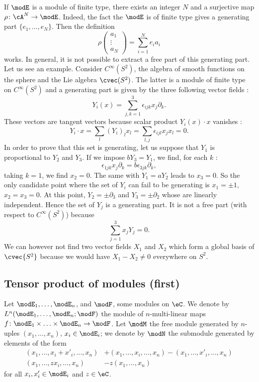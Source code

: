 If $\modE$ is a module of finite type, there exists an integer $N$ and a surjective map $\rho\colon \cA^N\to \modE$. Indeed, the fact the $\modE$ is of finite type gives a generating part $\{ e_1,\ldots,e_N \}$. Then the definition
\[ 
  \rho
\begin{pmatrix}
a_1\\\vdots\\ a_N
\end{pmatrix}
=
\sum_{i=1}^N e_ia_i
\]
works. In general, it is not possible to extract a free part of this generating part. Let us see an example. Consider $ C^{\infty}(S^2)$, the algebra of smooth functions on the sphere and the Lie algebra $\cvec(S^2)$. The latter is a module of finite type on $ C^{\infty}(S^2)$ and a generating part is given by the three following vector fields :
\[ 
  Y_i(x)=\sum_{j,k=1}^3 \epsilon_{ijk}x_j\partial_k.
\]
These vectors are tangent vectors because scalar product $Y_i(x)\cdot x$ vanishes :
\[ 
  Y_i\cdot x =\sum_l (Y_i)_lx_l=\sum_{l,j}\epsilon_{ijl} x_jx_l=0.
\]
In order to prove that this set is generating, let us suppose that $Y_1$ is proportional to $Y_2$ and $Y_3$. If we impose $bY_3=Y_1$, we find, for each $k$ :
\[ 
  \epsilon_{1jk} x_j\partial_k=b\epsilon_{3jk}\partial_k,
\]
taking $k=1$, we find $x_2=0$. The same with $Y_1=aY_2$ leads to $x_3=0$. So the only candidate point where the set of $Y_i$ can fail to be generating is $x_1=\pm 1$, $x_2=x_3=0$. At this point, $Y_2=\pm\partial_3$ and $Y_3=\pm\partial_2$ whose are linearly independent. Hence the set of $Y_j$ is a generating part. It is not a free part (with respect to $ C^{\infty}(S^2)$) because
\[ 
  \sum_{j=1}^3 x_jY_j=0.
\]
We can however not find two vector fields $X_1$ and $X_2$ which form a global basis of $\cvec{S^2}$ because we would have $X_1-X_2\neq0$ everywhere on $S^2$.

\subsection{Tensor product of modules (first)}

Let $\modE_1,\ldots,\modE_n$, and $\modF$, some modules on $\eC$. We denote by $L^n(\modE_1,\ldots,\modE_n;\modF)$ the module of $n$-multi-linear maps $f\colon \modE_1\times\ldots\times\modE_n\to \modF$. Let $\modM$ the free module generated by $n$-uples $(x_1,\ldots,x_n)$, $x_i\in\modE_i$; we denote by $\modN$ the submodule generated by elements of the form
\begin{subequations}
\begin{align}
(x_1,\ldots,x_i+x'_i,\ldots,x_n)&+(x_1,\ldots,x_i,\ldots,x_n)-(x_1,\ldots,x'_i,\ldots,x_n)\\
(x_1,\ldots,zx_i,\ldots,x_n)&-z(x_1,\ldots,x_n)
\end{align}
\end{subequations}
for all $x_i,x'_i\in\modE_i$ and $z\in\eC$.

